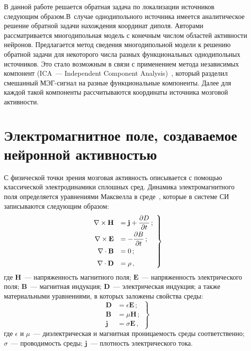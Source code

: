 \begin{multicols}{2}
В данной работе решается обратная задача по локализации источников
следующим образом.\linebreak В~случае однодипольного источника имеется
аналитическое решение обратной задачи нахождения координат диполя.
Авторами рассматривается многодипольная модель с конечным числом
областей активности нейронов. Предлагается метод сведения
многодипольной модели к решению обратной задачи для некоторого числа
разных функциональных однодипольных источников. Это стало возможным
в связи с применением метода независимых компонент (ICA~--- Independent
Component Analysis)~\cite{ICA},
который разделил смешанный МЭГ-сиг\-нал на разные функциональные
компоненты. Далее для каждой такой компоненты рассчитываются
координаты источника мозговой активности.

\section{Электромагнитное поле, создаваемое нейронной активностью}

С физической точки зрения мозговая активность описывается с помощью
классической электродинамики сплошных сред. Динамика
электромагнитного поля определяется уравнениями Максвел\-ла в среде~\cite{landau},
которые в системе СИ записываются следующим образом:
\begin{equation}
\left.
\begin{array}{rl}
\nabla \times \mathbf{ H} &= \mathbf {j} + \displaystyle\frac{\displaystyle \partial D\mathstrut}{\displaystyle \partial t\mathstrut}\, ;\\[6pt]
\nabla \times \mathbf{ E} &= -\displaystyle\frac{\displaystyle \partial B\mathstrut}{\displaystyle \partial t\mathstrut} \,; \\[6pt]
\nabla \cdot\mathbf{B} &= 0 \,;\\[6pt]
\nabla \cdot\mathbf{D} &=  \rho\,,
\end{array}
\right\}
\label{maxwell}
\end{equation}
где ${\mathbf H}$~--- напряженность магнитного поля;
${\mathbf E}$~--- напряженность электрического поля;  ${\mathbf B}$~---
магнитная индукция;  ${\mathbf D}$~--- электрическая индукция;
а также материальными уравнениями, в которых заложены свойства среды:
\begin{equation}
\left.
\begin{array}{rl}
 \mathbf {D} &= \epsilon \mathbf{E} \,;\\[6pt]
 \mathbf {B} &= \mu \mathbf{ H}  \,;\\[6pt]
 \mathbf {j} &= \sigma \mathbf{E} \,,
 \end{array}
 \right\}
 \label{material}
\end{equation}
\noindent где $\epsilon$ и $\mu$~--- диэлектрическая и магнитная проницаемость
среды соответственно; $\sigma$~--- проводимость среды; ${\mathbf j}$~---
плот\-ность электрического тока.




\end{multicols}
